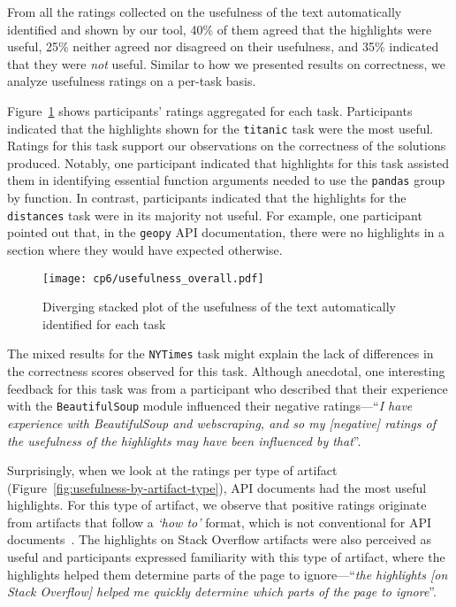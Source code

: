 From all the ratings collected on the  usefulness of the text automatically identified and shown by our tool, 40\% of them agreed that the highlights were useful, 
25\% neither agreed nor disagreed on their usefulness, and 35\% indicated that they were \textit{not} useful.
Similar to how we presented results on correctness, we analyze usefulness ratings on a per-task basis.  



Figure~\ref{fig:usefulness-by-task} shows participants' ratings aggregated for each task. 
Participants indicated that the highlights shown for the \texttt{titanic} task were the most useful. 
Ratings for this task support our observations on the correctness of the solutions produced. 
Notably, one participant indicated that highlights for this task assisted them in identifying essential function arguments needed to use the \texttt{pandas} group by function.
In contrast, participants indicated that the highlights for the \texttt{distances} task were in its majority not useful. 
For example, one participant pointed out that, in the \texttt{geopy} API documentation, there were no highlights in 
a section where they would have expected otherwise.



\begin{figure}
    \centering
    \texttt{[image: cp6/usefulness\_overall.pdf]}
    \caption{Diverging stacked plot of the usefulness of the text automatically identified for each task}
    \label{fig:usefulness-by-task}
\end{figure}


The mixed results for the \texttt{NYTimes} task might explain the lack of differences in the correctness scores observed for this task. 
Although anecdotal, one interesting feedback for this task was from a participant who described that 
their experience with the \texttt{BeautifulSoup} module influenced their negative ratings---``\textit{I have experience with BeautifulSoup and webscraping, and so my [negative] ratings of the usefulness of the highlights may have been influenced by that}''.



Surprisingly, when we look at the ratings per type of artifact (Figure~\ref{fig:usefulness-by-artifact-type}), API documents had the most useful highlights.
For this type of artifact, we observe that positive ratings originate from artifacts that follow a \textit{`how to'} format,
which is not conventional for API documents~\cite{robillard2011field, arya2020}. The highlights on Stack Overflow artifacts were also perceived as useful
and participants expressed familiarity with this type of artifact, where the highlights helped them determine parts of the page to ignore---``\textit{the highlights [on Stack Overflow] helped me quickly determine which parts of the page to ignore}''.



